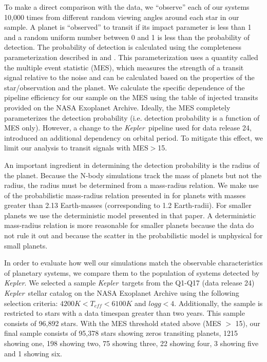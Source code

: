 \documentclass{emulateapj}
\def\kepler{{\slshape Kepler}}
\begin{document}
 To make a direct comparison with the data, we ``observe'' each of our systems 10,000 times from different random viewing angles around each star in our sample. A planet is ``observed'' to transit if its impact parameter is less than 1 and a random uniform number between 0 and 1 is less than the probability of detection. The probability of detection is calculated using the completeness parameterization described in \citet{Burke15} and \citet{Christiansen15}. This parameterization uses a quantity called the multiple event statistic (MES), which measures the strength of a transit signal relative to the noise and can be calculated based on the properties of the star/observation and the planet. We calculate the specific dependence of the pipeline efficiency for our sample on the MES using the table of injected transits provided on the NASA Exoplanet Archive. Ideally, the MES completely parameterizes the detection probability (i.e. detection probability is a function of MES only). However, a change to the \kepler\ pipeline used for data release 24, introduced an additional dependency on orbital period. To mitigate this effect, we limit our analysis to transit signals with MES$>$15.

 An important ingredient in determining the detection probability is the radius of the planet. Because the N-body simulations track the mass of planets but not the radius, the radius must be determined from a mass-radius relation. We make use of the probabilistic mass-radius relation presented in \citet{Wolfgang15b} for planets with masses greater than 2.13 Earth-masses (corresponding to 1.2 Earth-radii). For smaller planets we use the deterministic model presented in that paper. A deterministic mass-radius relation is more reasonable for smaller planets because the data do not rule it out and because the scatter in the probabilistic model is unphysical for small planets.

 In order to evaluate how well our simulations match the observable characteristics of planetary systems, we compare them to the population of systems detected by \kepler. We selected a sample \kepler\ targets from the Q1-Q17 (data release 24) \kepler\ stellar catalog \citep{Huber14} on the NASA Exoplanet Archive \citep{Akeson13} using the following selection criteria: $4200K < T_{eff} < 6100K$ and $logg < 4$.   Additionally, the sample is restricted to stars with a data timespan greater than two years. This sample consists of 96,892 stars. With the MES threshold stated above (MES $>$ 15), our final sample consists of 95,378 stars showing zeros transiting planets, 1215 showing one, 198 showing two, 75 showing three, 22 showing four, 3 showing five and 1 showing six.
\end{document}
